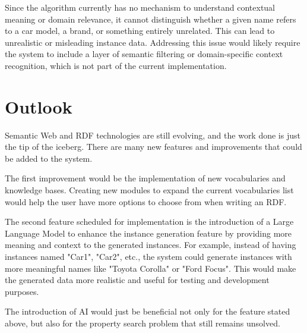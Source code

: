 Since the algorithm currently has no mechanism to understand contextual meaning or domain relevance, it cannot distinguish whether a given name refers to a car model, a brand, or something entirely unrelated. This can lead to unrealistic or misleading instance data. Addressing this issue would likely require the system to include a layer of semantic filtering or domain-specific context recognition, which is not part of the current implementation.

\section{Outlook\label{sec:outlook}}

Semantic Web and RDF technologies are still evolving, and the work done is just the tip of the iceberg. There are many new features and improvements that could be added to the system. 

The first improvement would be the implementation of new vocabularies and knowledge bases. Creating new modules to expand the current vocabularies list would help the user have more options to choose from when writing an RDF.

The second feature scheduled for implementation is the introduction of a Large Language Model to enhance the instance generation feature by providing more meaning and context to the generated instances. For example, instead of having instances named "Car1", "Car2", etc., the system could generate instances with more meaningful names like "Toyota Corolla" or "Ford Focus". This would make the generated data more realistic and useful for testing and development purposes.

The introduction of AI would just be beneficial not only for the feature stated above, but also for the property search problem that still remains unsolved.